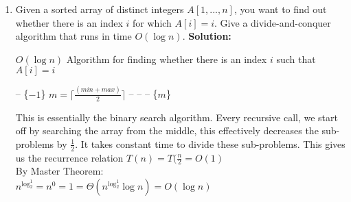 \documentclass[11pt]{article}
\begin{document}
\begin{enumerate}
\textbf{Solution:}\\
Proof by keeping ahead \& contradiction\\
Consider two sets of coins that have the same value; our set (Greedy algorithm) $S$, and the optimal set $S^\prime$.\\
$S:$ \{50, 20, 20...\}\\
\hspace*{2cm} r\^\\
$S^\prime:$ \{50, 20, 10, 10...\}\\
\hspace*{2cm} r\^\\
Both algorithms produce the same coins up until the $r^{th}$ position. If the $r^{th}$ and $r^{th}+1$ position of the $S^\prime$ set of coins are replaced with the $r^{th}$ coin in the $S$ set, the $S^\prime$ will agree with the $S$ set. If we continue this for the entire set, the optimal set will agree with the greedy set. This shows that the greedy set uses fewer coins than the optimal set. This is a contradiction.

\item 
Given a sorted array of distinct integers $A[1, . . . , n]$, you want to
find out whether there is an index $i$ for which $A[i] = i$. Give a
divide-and-conquer algorithm that runs in time $O(\log n).$
\textbf{Solution:}
\begin{algorithm}
\caption{$O(\log n)$ Algorithm for finding whether there is an index $i$ such that $A[i] = i$}
	\begin{algorithmic}
		 -- \{\Return $-1$\} \EndIf
    	$m = \lceil \frac{(min + max)}{2} \rceil$
         --  \EndIf
         --  \EndIf
         -- \{\Return $m$\} \EndIf
    \EndProcedure
	\end{algorithmic}
    \label{alg-bin}
\end{algorithm}

This is essentially the binary search algorithm. Every recursive call, we start off by searching the array from the middle, this effectively decreases the sub-problems by $\frac{1}{2}$. It takes constant time to divide these sub-problems. This gives us the recurrence relation $T(n) = T(\frac{n}{2} = O(1)$\\
By Master Theorem:\\
$n^{\log_2^1} = n^0 = 1 = \Theta(n^{\log_2^1} \log n) = O(\log n) $


\end{enumerate}
\end{document}
